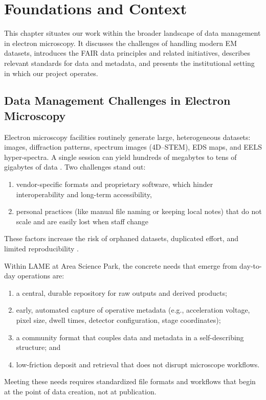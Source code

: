 \chapter{Foundations and Context}
\label{chap:foundations}

This chapter situates our work within the broader landscape of data management in electron microscopy. 
It discusses the challenges of handling modern EM datasets, introduces the FAIR data principles and related initiatives, describes relevant standards for data and metadata, and presents the institutional setting in which our project operates.

\section{Data Management Challenges in Electron Microscopy}

Electron microscopy facilities routinely generate large, heterogeneous datasets: images, diffraction patterns, spectrum images (4D--STEM), EDS maps, and EELS hyper-spectra. 
A single session can yield hundreds of megabytes to tens of gigabytes of data \parencite{Poger2023BigDataEM}. 
Two challenges stand out: 

\begin{enumerate}
	\item vendor-specific formats and proprietary software, which hinder interoperability and long-term accessibility,
	\item personal practices (like manual file naming or keeping local notes) that do not scale and are easily lost when staff change \parencite{Moore2021OMENGFF,Korir2024TenRecs}
\end{enumerate}

These factors increase the risk of orphaned datasets, duplicated effort, and limited reproducibility \parencite{Poger2023BigDataEM,Korir2024TenRecs}.

Within LAME at Area Science Park, the concrete needs that emerge from day-to-day operations are:
\begin{enumerate}[label=(\alph*)]
	\item a central, durable repository for raw outputs and derived products;
	\item early, automated capture of operative metadata (e.g., acceleration voltage, pixel size, dwell times, detector configuration, stage coordinates);
	\item a community format that couples data and metadata in a self-describing structure; and
	\item low-friction deposit and retrieval that does not disrupt microscope workflows.
\end{enumerate}
Meeting these needs requires standardized file formats and workflows that begin at the point of data creation, not at publication.

